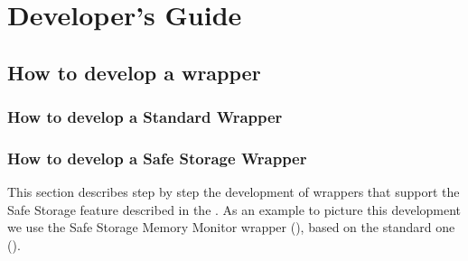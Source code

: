 \graphicspath{{chapters/ch-developer-guide/figures/}}

\chapter{Developer's Guide}

\section{How to develop a wrapper}

\subsection{How to develop a Standard Wrapper  \label{sec:developer-guide_wrappers}}

\subsection{How to develop a Safe Storage Wrapper}

This section describes step by step the development of wrappers that support the Safe Storage feature described in the .
As an example to picture this development we use the Safe Storage Memory Monitor wrapper (), based on the 
standard one ().

